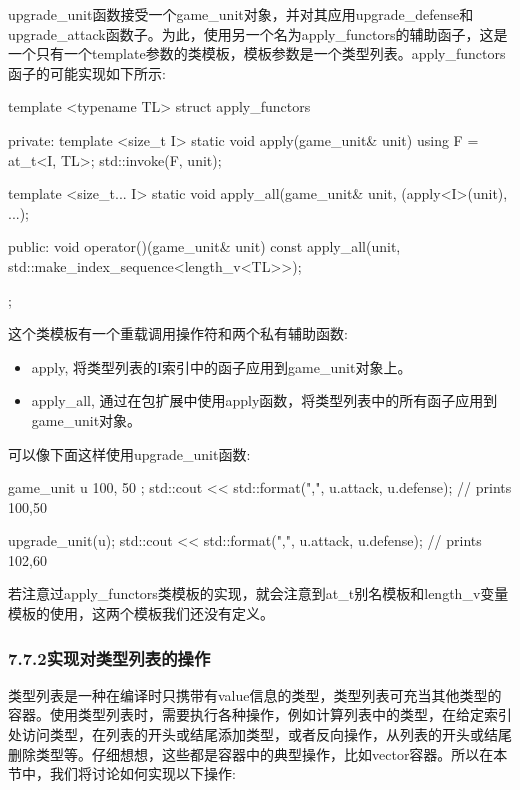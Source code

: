 upgrade\_unit函数接受一个game\_unit对象，并对其应用upgrade\_defense和upgrade\_attack函数子。为此，使用另一个名为apply\_functors的辅助函子，这是一个只有一个template参数的类模板，模板参数是一个类型列表。apply\_functors函子的可能实现如下所示:

\begin{cpp}
template <typename TL>
struct apply_functors
{
private:
	template <size_t I>
	static void apply(game_unit& unit)
	{
		using F = at_t<I, TL>;
		std::invoke(F{}, unit);
	}

	template <size_t... I>
	static void apply_all(game_unit& unit,
	{
		(apply<I>(unit), ...);
	}

public:
	void operator()(game_unit& unit) const
	{
		apply_all(unit,
		std::make_index_sequence<length_v<TL>>{});
	}
};
\end{cpp}

这个类模板有一个重载调用操作符和两个私有辅助函数:

\begin{itemize}
\item
apply, 将类型列表的I索引中的函子应用到game\_unit对象上。

\item
apply\_all, 通过在包扩展中使用apply函数，将类型列表中的所有函子应用到game\_unit对象。
\end{itemize}

可以像下面这样使用upgrade\_unit函数:

\begin{cpp}
game_unit u{ 100, 50 };
std::cout << std::format("{},{}\n", u.attack, u.defense);
// prints 100,50

upgrade_unit(u);
std::cout << std::format("{},{}\n", u.attack, u.defense);
// prints 102,60
\end{cpp}

若注意过apply\_functors类模板的实现，就会注意到at\_t别名模板和length\_v变量模板的使用，这两个模板我们还没有定义。

\subsubsection{7.7.2\hspace{0.2cm}实现对类型列表的操作}

类型列表是一种在编译时只携带有value信息的类型，类型列表可充当其他类型的容器。使用类型列表时，需要执行各种操作，例如计算列表中的类型，在给定索引处访问类型，在列表的开头或结尾添加类型，或者反向操作，从列表的开头或结尾删除类型等。仔细想想，这些都是容器中的典型操作，比如vector容器。所以在本节中，我们将讨论如何实现以下操作:

